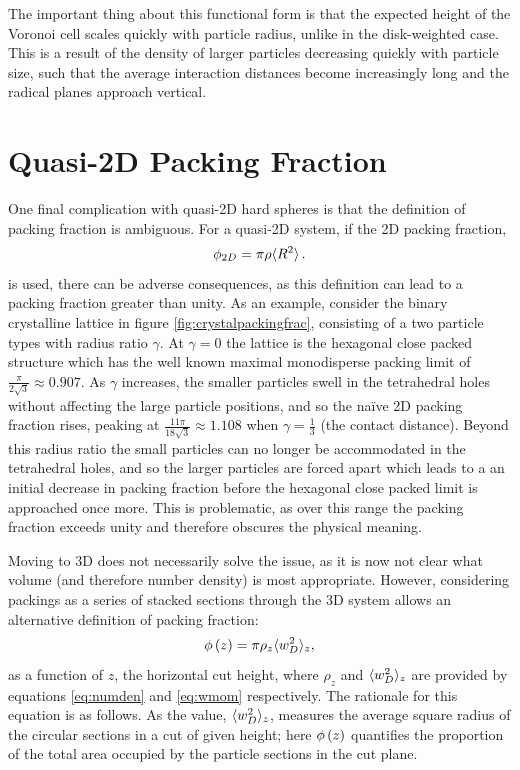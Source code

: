 The important thing about this functional form is that the expected height of the Voronoi cell scales quickly with particle radius, unlike in the disk\--weighted case.
This is a result of the density of larger particles decreasing quickly with particle size, such that the average interaction distances become increasingly long and the radical planes approach vertical.

\section{Quasi-2D Packing Fraction}
\label{s:qtdpackingfrac}

One final complication with quasi\--2D hard spheres is that the definition of packing fraction is ambiguous.
For a quasi\--2D system, if the 2D packing fraction,
\begin{equation}
	\label{eq:simplepackingfrac}
	\phi_{2D}=\pi\rho\langle R^2\rangle\,.
\end{equation}
is used, there can be adverse consequences, as this definition can lead to a packing fraction greater than unity.
As an example, consider the binary crystalline lattice in figure \ref{fig:crystalpackingfrac}, consisting of a two particle types with radius ratio $\gamma$.
At $\gamma=0$ the lattice is the hexagonal close packed structure which has the well known maximal monodisperse packing limit of $\frac{\pi}{2\sqrt{3}}\approx0.907$.
As $\gamma$ increases, the smaller particles swell in the tetrahedral holes without affecting the large particle positions, and so the na\"ive 2D packing fraction rises, peaking at $\frac{11\pi}{18\sqrt{3}}\approx1.108$ when $\gamma=\frac{1}{3}$ (the contact distance).
Beyond this radius ratio the small particles can no longer be accommodated in the tetrahedral holes, and so the larger particles are forced apart which leads to a an initial decrease in packing fraction before the hexagonal close packed limit is approached once more.
This is problematic, as over this range the packing fraction exceeds unity and therefore obscures the physical meaning.

Moving to 3D does not necessarily solve the issue, as it is now not clear what volume (and therefore number density) is most appropriate.
However, considering \qtd{} packings as a series of stacked sections through the 3D system allows an alternative definition of packing fraction:
\begin{equation}
	\label{eq:altpackingfrac}
	\phi\left(z\right) = \pi\rho_z\langle w_D^2 \rangle_z,
\end{equation}
as a function of $z$, the horizontal cut height, where $\rho_z$ and $\langle w_D^2 \rangle_z$ are provided by equations \eqref{eq:numden} and \eqref{eq:wmom} respectively.
The rationale for this equation is as follows. 
As the value, $\langle w_D^2 \rangle_z$, measures the average square radius of the circular sections in a cut of given height; here $\phi\left(z\right)$ quantifies the proportion of the total area occupied by the particle sections in the cut plane.

